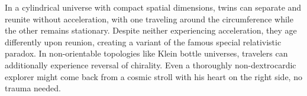 In a cylindrical universe with compact spatial dimensions, twins can separate and reunite without acceleration, with one traveling around the circumference while the other remains stationary. Despite neither experiencing acceleration, they age differently upon reunion, creating a variant of the famous special relativistic paradox. In non-orientable topologies like Klein bottle universes, travelers can additionally experience reversal of chirality. Even a thoroughly non-dextrocardic explorer might come back from a cosmic stroll with his heart on the right side, no trauma needed.
